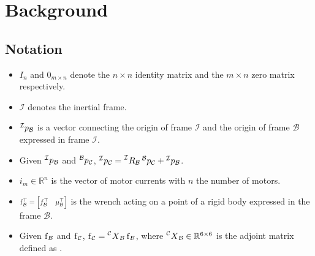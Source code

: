 \section{Background}
\label{sec:background}

\subsection{Notation}
\begin{itemize}
\item $I_{n}$ and $0_{m \times n}$ denote the $n \times n$ identity matrix and the $m \times n$ zero matrix respectively.
\item $\mathcal{I}$ denotes the inertial frame.
\item $\prescript{\mathcal{I}}{}{p}_\mathcal{B}$ is a vector connecting the origin of frame $\mathcal{I}$ and the origin of frame $\mathcal{B}$ expressed in frame $\mathcal{I}$.
\item Given $\prescript{\mathcal{I}}{}{p}_\mathcal{B}$ and $\prescript{\mathcal{B}}{}{p}_\mathcal{C}$,  $\prescript{\mathcal{I}}{}{p}_\mathcal{C} = \prescript{\mathcal{I}}{}{R}_\mathcal{B} \prescript{\mathcal{B}}{}{p}_\mathcal{C} + \prescript{\mathcal{I}}{}{p}_\mathcal{B}$.
\item $i_m \in \mathbb{R}^n$ is the vector of motor currents with $n$ the number of motors. 
\item $\scalebox{0.8}{$\prescript{}{}{\mathrm{f}}_\mathcal{B}^ \top = \begin{bmatrix} {{f}}_\mathcal{B} ^ \top & {\mu}_\mathcal{B}^ \top \end{bmatrix}$}$ is the wrench acting on a point of a rigid body expressed in the frame $\mathcal{B}$.
\item Given $\prescript{}{}{\mathrm{f}}_\mathcal{B}$ and $\prescript{}{}{\mathrm{f}}_\mathcal{C}$, $\prescript{}{}{\mathrm{f}}_\mathcal{C} = \prescript{\mathcal{C}}{}{X}_\mathcal{B} \prescript{}{}{\mathrm{f}}_\mathcal{B}$, where $\prescript{\mathcal{C}}{}{X}_\mathcal{B} \in \mathbb{R}^{6 \times 6}$ is the adjoint matrix defined as 
.
\end{itemize}

